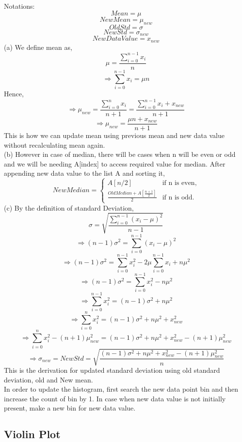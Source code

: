 \documentclass[a4paper,12pt,answers]{exam}
\begin{document}
\begin{questions}
\begin{solution}\\
Notations:
\[
Mean=\mu
\]
\[
NewMean=\mu_{new}
\]
\[
OldStd=\sigma
\]
\[
NewStd=\sigma_{new}
\]
\[
NewDataValue=x_{new}
\]
(a) We define mean as,
\[
    \mu=\frac{\sum_{i=0}^{n-1} {x_{i}}}{n}
\]
\[
\Rightarrow \sum_{i=0}^{n-1} {x_{i}} = \mu n
\]
Hence,
\[
\Rightarrow \mu_{new} = \frac{\sum_{i=0}^{n} {x_{i}}}{n+1}
=\frac{\sum_{i=0}^{n-1} {x_{i}} + x_{new}}{n+1}
\]
\[
\Rightarrow \mu_{new} = \frac{\mu n + x_{new}}{n+1}
\]
This is how we can update mean using previous mean and new data value without recalculating mean again.\\
(b) However in case of median, there will be cases when n will be even or odd and we will be needing A[index] to access required value for median.
After appending new data value to the list A and sorting it,
\[
NewMedian=\begin{cases} 
A[n/2] & \text{if n is even} , \\
\frac{OldMedian+A[\frac{n+1}{2}]}{2} & \text{if n is odd}.
\end{cases}
\]
(c) By the definition of standard Deviation,
\[
\sigma=\sqrt{\frac{\sum_{i=0}^{n-1}{(x_{i}-\mu)^2}}{n-1}}
\]
\[
\Rightarrow(n-1)\sigma^2 = \sum_{i=0}^{n-1}{(x_{i}-\mu)^2}
\]
\[
\Rightarrow(n-1)\sigma^2 = \sum_{i=0}^{n-1}{x_{i}^2} - 2\mu\sum_{i=0}^{n-1}{x_{i}} + n\mu^2
\]
\[
\Rightarrow(n-1)\sigma^2 = \sum_{i=0}^{n-1}{x_{i}^2} -n\mu^2
\]
\[
\Rightarrow \sum_{i=0}^{n-1}{x_{i}^2} = (n-1)\sigma^2 + n\mu^2
\]
\[
    \Rightarrow \sum_{i=0}^{n}{x_{i}^2} = (n-1)\sigma^2 + n\mu^2 + x_{new}^2
\]
\[
    \Rightarrow \sum_{i=0}^{n}{x_{i}^2} - (n+1)\mu_{new}^2 = (n-1)\sigma^2 + n\mu^2  + x_{new}^2 - (n+1)\mu_{new}^2
\]
\[
\Rightarrow \sigma_{new} = NewStd = \sqrt{\frac{(n-1)\sigma^2 + n\mu^2 + x_{new}^2 - (n+1)\mu_{new}^2}{n}}
\]
This is the derivation for updated standard deviation using old standard deviation, old and New mean.\\
In order to update the histogram, first search the new data point bin and then increase the count of bin by 1. In case when new data value is not initially present, make a new bin for new data value.
\end{solution}


\begin{parts}
\part{Violin Plot}


\end{parts}
\end{questions}
\end{document}
